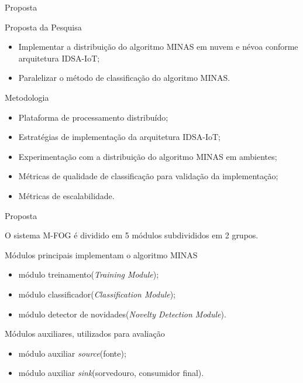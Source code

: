 \documentclass[aspectratio=43,10pt]{beamer}
\newcommand{\mfog}{sistema M-FOG\xspace}
\newcommand{\idsiot}{IDSA-IoT\xspace}
\begin{document}
\begin{frame}[fragile]{Proposta}
  \begin{block}{Proposta da Pesquisa}
    \begin{itemize}
      
      \item Implementar a distribuição do algoritmo MINAS em nuvem e névoa
      conforme arquitetura \idsiot;
      
      \item Paralelizar o método de classificação do algoritmo MINAS.
    \end{itemize}
  \end{block}

  \begin{alertblock}{Metodologia}
    \begin{itemize}%
      \item Plataforma de processamento distribuído;
      \item Estratégias de implementação da arquitetura \idsiot;
      \item Experimentação com a distribuição do algoritmo MINAS em ambientes;
      \item Métricas de qualidade de classificação para validação da implementação;
      \item Métricas de escalabilidade.
    \end{itemize}
  \end{alertblock}
\end{frame}


\newcommand{\source}{módulo auxiliar \textit{source}\xspace}
\newcommand{\sink}{módulo auxiliar \textit{sink}\xspace}

\newcommand{\offline}{módulo treinamento\xspace}
\newcommand{\classify}{módulo classificador\xspace}
\newcommand{\detector}{módulo detector de novidades\xspace}

\begin{frame}[fragile]{Proposta}

  O \mfog é dividido em 5 módulos subdivididos em 2 grupos.
  
  \begin{alertblock}{Módulos principais implementam o algoritmo MINAS}
    \begin{itemize}
      \item \offline (\textit{Training Module});
      \item \classify (\textit{Classification Module});
      \item \detector (\textit{Novelty Detection Module}).
    \end{itemize}
  \end{alertblock}
  \begin{alertblock}{Módulos auxiliares, utilizados para avaliação}
    \begin{itemize}
      \item \source (fonte);
      \item \sink (sorvedouro, consumidor final).
    \end{itemize}
  \end{alertblock}
\end{frame}
\end{document}
